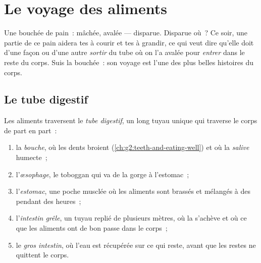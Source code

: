 \chapter{Le voyage des aliments}\label{ch:g4:journey-of-food}

Une bouchée de pain~: mâchée, avalée --- disparue. Disparue où~? Ce
soir, une partie de ce pain aidera tes  à courir et tes  à
grandir, ce qui veut dire qu'elle doit d'une façon ou d'une autre
\emph{sortir} du tube où on l'a avalée pour \emph{entrer} dans le
reste du corps. Suis la bouchée~: son voyage est l'une des plus
belles histoires du corps.

\section{Le tube digestif}

\begin{definition}\label{def:g4:journey-of-food:tract}
Les aliments traversent le \emph{tube digestif}, un long tuyau unique qui traverse le corps de part en
part~:
\begin{enumerate}
  \item la \emph{bouche}, où les dents broient
        (\cref{ch:g2:teeth-and-eating-well}) et où la
        \emph{salive} humecte~;
  \item l'\emph{œsophage}, le toboggan qui va de la
        gorge à l'estomac~;
  \item l'\emph{estomac}, une poche musclée où les
        aliments sont brassés et mélangés à des 
        pendant des heures~;
  \item l'\emph{intestin grêle}, un tuyau
        replié de plusieurs mètres, où la  s'achève et où
        ce que les aliments ont de bon passe dans le corps~;
  \item le \emph{gros intestin}, où l'eau est
        récupérée sur ce qui reste, avant que les restes ne
        quittent le corps.
\end{enumerate}
\end{definition}

